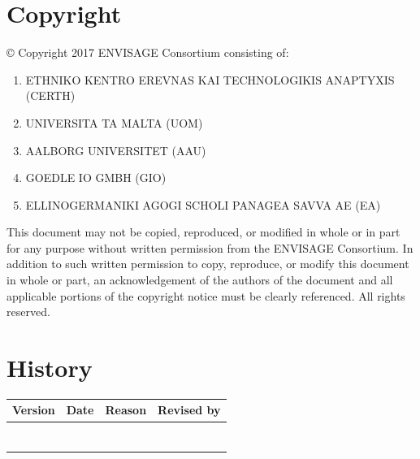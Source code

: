 \documentclass[12pt]{article}
\begin{document}
\section*{Copyright}

© Copyright 2017 ENVISAGE Consortium consisting of:
\begin{enumerate}
\item ETHNIKO KENTRO EREVNAS KAI TECHNOLOGIKIS ANAPTYXIS (CERTH)
\item UNIVERSITA TA MALTA (UOM)
\item AALBORG UNIVERSITET (AAU) 
\item GOEDLE IO GMBH (GIO)
\item ELLINOGERMANIKI AGOGI SCHOLI PANAGEA SAVVA AE (EA)
\end{enumerate}
This document may not be copied, reproduced, or modified in whole or in part for any purpose without written permission from the ENVISAGE Consortium. In addition to such written permission to copy, reproduce, or modify this document in whole or part, an acknowledgement of the authors of the document and all applicable portions of the copyright notice must be clearly referenced.
\newline
\newline
All rights reserved.
\clearpage

\section*{History}
\begin{table}[h]
	\centering
	\begin{tabular}{|l|l|l|l|}
	\hline
	\cellcolor{lightgray}\textbf{Version} & \cellcolor{lightgray}\textbf{Date} & \cellcolor{lightgray}\textbf{Reason} & \cellcolor{lightgray}\textbf{Revised by}\\
	\hline
	& & & \\
	\hline
	& & & \\
	\hline
	& & & \\
	\hline
	& & & \\
	\hline
	& & & \\
	\hline
	& & & \\
	\hline
	\multicolumn{4}{p{\linewidth}}{}\\ %
	\end{tabular}
\end{table}
\end{document}
